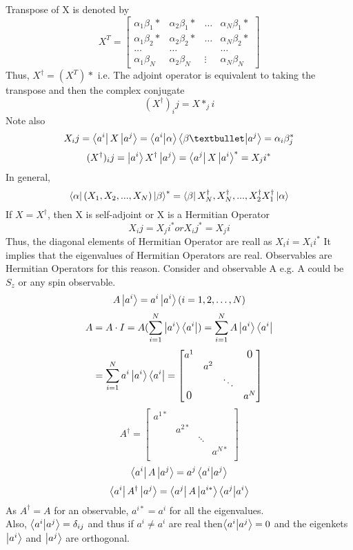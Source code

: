 \documentclass{book}
\begin{document}
Transpose of X is denoted by 
$$X^T = 
\begin{bmatrix}
   \alpha_1\beta_1* & \alpha_2\beta_1* &  \hdots & \alpha_N\beta_1* \\
   \alpha_1\beta_2* & \alpha_2\beta_2* & \hdots & \alpha_N\beta_2* \\
   \hdots & \hdots & & \hdots \\
   \alpha_1\beta_N & \alpha_2\beta_N & \vdots & \alpha_N\beta_N
\end{bmatrix}
$$
Thus, $ X^\dagger = (X^T)*$
i.e. The adjoint operator is equivalent to taking the transpose and then the complex conjugate
$$(X^\dagger)_ij = X*_ji$$
Note also
$$X_ij = \bra{a^i} X \ket{a^j} = \bra{a^i}\ket{\alpha}\bra{\beta•}\ket{a^j} = \alpha_i\beta_j^*$$
$$(X^\dagger)_ij = \ket{a^i} X^\dagger \ket{a^j} = \bra{a^j} X \ket{a^i}^* = X_ji^*$$
In general,
$$ \bra{\alpha} (X_1, X_2, ... , X_N) \ket{\beta}^* = \bra{\beta} X_N^\dagger, X_N ^\dagger, ... , X_2^\dagger X_1^\dagger \ket{\alpha} $$
If $X = X^\dagger$, then X is self-adjoint or X is a Hermitian Operator
$$X_ij = X_ji^* or X_ij^* = X_ji$$
Thus, the diagonal elements of Hermitian Operator are reall as $X_ii = X_ii^*$
It implies that the eigenvalues of Hermitian Operators are real. Observables are Hermitian Operators for this reason. Consider and observable A e.g. A could be $S_z$ or any spin observable.
$$ A\ket{a^i} = a^i\ket{a^i} (i = 1, 2, \hdots, N) $$
$$ A = A \cdot{} I = A ( \sum^N_{i=1} \ket{a^i}\bra{a^i}) = \sum^N_{i=1} A \ket{a^i}\bra{a^i}$$
$$ = \sum^N_{i=1} a^i \ket{a^i} \bra{a^i} = 
\begin{bmatrix}
   a^1 & & & \text{\large 0} \\
     & a^2 \\
    & & \ddots	\\
     \text{\large 0} & & & a^N
\end{bmatrix}
$$
$$A^\dagger = \begin{bmatrix}
 a^{1*} \\
 & a^{2*} \\
 & & \ddots \\
 & & & a^{N*} \\
\end{bmatrix}
$$
$$ \bra{a^i} A \ket{a^j} = a ^j \braket{a^i}{a^j} $$
$$\bra{a^i} A^\dagger \ket{a^j} = \bra{a^j} A \ket{a^{i*}} \braket{a^j}{a^i}$$
As $A^\dagger = A$ for an observable, $a^{i*} = a^i$ for all the eigenvalues. \\
Also, $\braket{a^i}{a^j} = \delta_{ij}$ and thus if $a^i \neq a^i$ are real then$\braket{a^i}{a^j} = 0$ and the eigenkets $\ket{a^i}$ and $\ket{a^j}$ are orthogonal.
\end{document}

